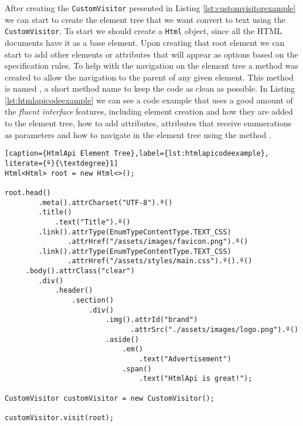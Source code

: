 \noindent
After creating the \texttt{CustomVisitor} presented in Listing \ref{lst:customvisitorexample} we can start to create the element tree that we want convert to text using the \texttt{CustomVisitor}. To start we should create a \texttt{Html} object, since all the \ac{HTML} documents have it as a base element. Upon creating that root element we can start to add other elements or attributes that will appear as options based on the specification rules. To help with the navigation on the element tree a method was created to allow the navigation to the parent of any given element. This method is named \texttt{\textdegree}, a short method name to keep the code as clean as possible. In Listing \ref{lst:htmlapicodeexample} we can see a code example that uses a good amount of the \textit{fluent interface} features, including element creation and how they are added to the element tree, how to add attributes, attributes that receive enumerations as parameters and how to navigate in the element tree using the method \texttt{\textdegree}.

\bigskip


\begin{minipage}{\linewidth}
\begin{lstlisting}[caption={HtmlApi Element Tree},label={lst:htmlapicodeexample}, literate={º}{\textdegree}1]
Html<Html> root = new Html<>();

root.head()
        .meta().attrCharset("UTF-8").º()
        .title()
            .text("Title").º()
        .link().attrType(EnumTypeContentType.TEXT_CSS)
               .attrHref("/assets/images/favicon.png").º()
        .link().attrType(EnumTypeContentType.TEXT_CSS)
               .attrHref("/assets/styles/main.css").º().º()
     .body().attrClass("clear")
        .div()
            .header()
                .section()
                    .div()
                        .img().attrId("brand")
                              .attrSrc("./assets/images/logo.png").º()
                        .aside()
                            .em()
                                .text("Advertisement")
                            .span()
                                .text("HtmlApi is great!");
                                    
CustomVisitor customVisitor = new CustomVisitor();
    
customVisitor.visit(root);
\end{lstlisting}
\end{minipage}


